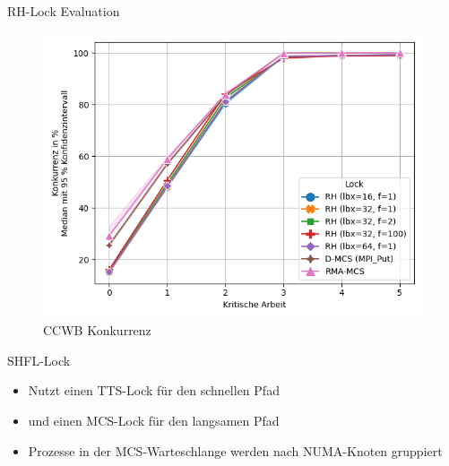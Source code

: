 \documentclass[fleqn,compress,utf8,aspectratio=169,t]{beamer}
\begin{document}
\begin{frame}{RH-Lock Evaluation}
\begin{minipage}{.49\textwidth}
\begin{figure}
            \includegraphics[width=\textwidth]{../../Dokumentation/Latex/Bilder/benchmarks/intelmpi/rh/CCWB-processes=112-contention}
            \caption{CCWB Konkurrenz}
        \end{figure}
    \end{minipage}
\end{frame}

\begin{frame}{SHFL-Lock}
    \begin{itemize}
        \item Nutzt einen TTS-Lock für den schnellen Pfad
        \item und einen MCS-Lock \cite{MCS-Lock} für den langsamen Pfad
        \item Prozesse in der MCS-Warteschlange werden nach NUMA-Knoten gruppiert
    \end{itemize}
\end{frame}
\end{document}
